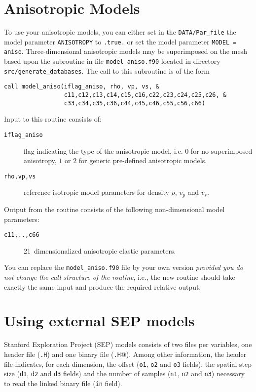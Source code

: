 \section{Anisotropic Models}\label{sec:Anisotropic-Models}

To use your anisotropic models, you can either set in the \texttt{DATA/Par\_file}
the model parameter \texttt{ANISOTROPY} to \texttt{.true.} or set
the model parameter \texttt{MODEL = aniso}. Three-dimensional anisotropic
models may be superimposed on the mesh based upon the subroutine in
file \texttt{model\_aniso.f90} located in directory \texttt{src/generate\_databases}.
The call to this subroutine is of the form
\begin{verbatim}
call model_aniso(iflag_aniso, rho, vp, vs, &
                 c11,c12,c13,c14,c15,c16,c22,c23,c24,c25,c26, &
                 c33,c34,c35,c36,c44,c45,c46,c55,c56,c66)
\end{verbatim}
Input to this routine consists of:
\begin{description}
\item [{\texttt{iflag\_aniso}}] flag indicating the type of the anisotropic
model, i.e. $0$ for no superimposed anisotropy, $1$ or $2$ for
generic pre-defined anisotropic models.
\item [{\texttt{rho,vp,vs}}] reference isotropic model parameters for density
$\rho$, $v_{p}$ and $v_{s}$.
\end{description}
Output from the routine consists of the following non-dimensional
model parameters:
\begin{description}
\item [{\texttt{c11,..,c66}}] 21~dimensionalized
anisotropic elastic parameters.
\end{description}
You can replace the \texttt{model\_aniso.f90} file by your own version
\textit{provided you do not change the call structure of the routine},
i.e., the new routine should take exactly the same input and produce
the required relative output.



\section{Using external SEP models}\label{sec:Using-SEP}

Stanford Exploration Project (SEP) models consists of two files per variables, one header file (\texttt{.H})
and one binary file (\texttt{.H$@$}).
Among other information, the header file indicates, for each dimension,
the offset (\texttt{o1}, \texttt{o2} and \texttt{o3} fields),
the spatial step size (\texttt{d1}, \texttt{d2} and \texttt{d3} fields)
and the number of samples (\texttt{n1}, \texttt{n2} and \texttt{n3}) necessary to read
the linked binary file (\texttt{in} field).

